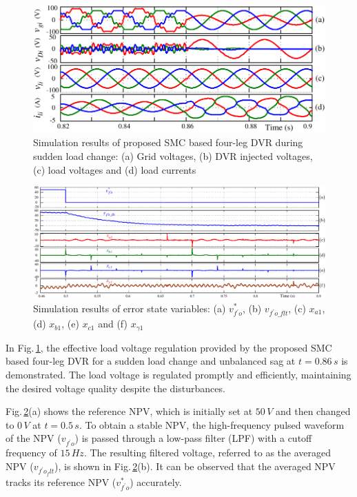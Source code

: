 \begin{figure}[]
	\centering
	\includegraphics[scale=1]{figures/Chapter_5/Mine/Res31.pdf}
	\caption{Simulation results of proposed SMC based four-leg DVR during sudden load change: (a) Grid voltages, (b) DVR injected voltages, (c) load voltages and (d) load currents} %
	\label{5.Res3}
\end{figure}
\begin{figure}\centering
	\includegraphics[scale=0.8	]{figures/Chapter_5/Mine/Res41.pdf}
	\caption{Simulation results of error state variables: (a) $v^{*}_{f^\prime o}$, (b) $v_{f^\prime o\_flt}$, (c) $x_{a1}$, (d) $x_{b1}$, (e) $x_{c1}$ and (f) $x_{\gamma 1}$} \vspace*{-0.4cm}
	\label{5.Res4}
\end{figure}   

In Fig.\,\ref{5.Res3}, the effective load voltage regulation provided by the proposed SMC based four-leg DVR for a sudden load change and unbalanced sag at $t = 0.86\,\si{s}$ is demonstrated. The load voltage is regulated promptly and efficiently, maintaining the desired voltage quality despite the disturbances.

Fig.\,\ref{5.Res4}(a) shows the reference NPV, which is initially set at $50\,\si{V}$ and then changed to $0\,\si{V}$ at $t = 0.5\,\si{s}$. To obtain a stable NPV, the high-frequency pulsed waveform of the NPV ($v_{f^{\prime}o}$) is passed through a low-pass filter (LPF) with a cutoff frequency of $15\,\si{Hz}$. The resulting filtered voltage, referred to as the averaged NPV ($v_{f^{\prime}o_flt}$), is shown in Fig.\,\ref{5.Res4}(b). It can be observed that the averaged NPV tracks its reference NPV ($v^{*}_{f^{\prime}o}$) accurately.

